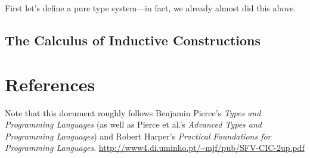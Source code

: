 \documentclass[10pt]{article}
\begin{document}
First let's define a pure type system---in fact, we already almost did this above.

\subsection{The Calculus of Inductive Constructions}

\section{References}


Note that this document roughly follows Benjamin Pierce's \emph{Types and Programming Languages} (as well as Pierce et al.'s \emph{Advanced Types and Programming Languages}) and Robert Harper's \emph{Practical Foundations for Programming Languages}.
\url{http://www4.di.uminho.pt/~mjf/pub/SFV-CIC-2up.pdf}
\end{document}

